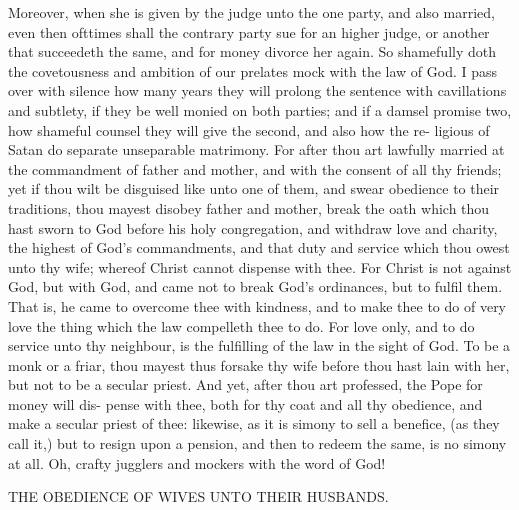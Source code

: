 \documentclass{custom}
\begin{document}
Moreover, when she is given by the judge unto the 
one party, and also married, even then ofttimes shall the 
contrary party sue for an higher judge, or another that 
succeedeth the same, and for money divorce her again. So 
shamefully doth the covetousness and ambition of our 
prelates mock with the law of God. I pass over with 
silence how many years they will prolong the sentence 
with cavillations and subtlety, if they be well monied on
both parties; and if a damsel promise two, how shameful
counsel they will give the second, and also how the re-
ligious of Satan do separate unseparable matrimony. For
after thou art lawfully married at the commandment of 
father and mother, and with the consent of all thy friends;
yet if thou wilt be disguised like unto one of them, and
swear obedience to their traditions, thou mayest disobey
father and mother, break the oath which thou hast sworn
to God before his holy congregation, and withdraw love
and charity, the highest of God's commandments, and 
that duty and service which thou owest unto thy wife;
whereof Christ cannot dispense with thee. For Christ is 
not against God, but with God, and came not to break 
God's ordinances, but to fulfil them. That is, he came 
to overcome thee with kindness, and to make thee to do of 
very love the thing which the law compelleth thee to do. 
For love only, and to do service unto thy neighbour, is the 
fulfilling of the law in the sight of God. To be a monk 
or a friar, thou mayest thus forsake thy wife before thou 
hast lain with her, but not to be a secular priest. And
yet, after thou art professed, the Pope for money will dis-
pense with thee, both for thy coat and all thy obedience,
and make a secular priest of thee: likewise, as it is 
simony to sell a benefice, (as they call it,) but to resign 
upon a pension, and then to redeem the same, is no simony 
at all. Oh, crafty jugglers and mockers with the word
of God! 


THE OBEDIENCE OF WIVES UNTO THEIR
HUSBANDS.
\end{document}

